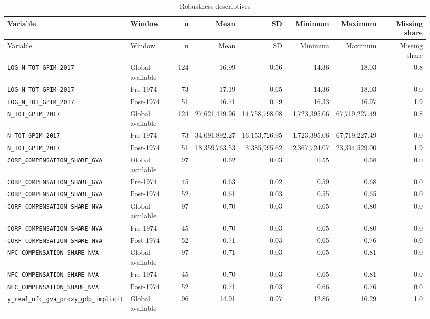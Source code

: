 \begin{landscape}
\begin{longtable}{p{4.4cm}p{3.8cm}rrrrrr}
\caption{Robustness descriptives}\\
\toprule
Variable & Window & n & Mean & SD & Minimum & Maximum & Missing share\\
\midrule
\endfirsthead
\toprule
Variable & Window & n & Mean & SD & Minimum & Maximum & Missing share\\
\midrule
\endhead
\nolinkurl{LOG_N_TOT_GPIM_2017} & Global available & 124 & 16.99 & 0.56 & 14.36 & 18.03 & 0.8
\\
\nolinkurl{LOG_N_TOT_GPIM_2017} & Pre-1974 & 73 & 17.19 & 0.65 & 14.36 & 18.03 & 0.0
\\
\nolinkurl{LOG_N_TOT_GPIM_2017} & Post-1974 & 51 & 16.71 & 0.19 & 16.33 & 16.97 & 1.9
\\
\nolinkurl{N_TOT_GPIM_2017} & Global available & 124 & 27,621,419.96 & 14,758,798.08 & 1,723,395.06 & 67,719,227.49 & 0.8
\\
\nolinkurl{N_TOT_GPIM_2017} & Pre-1974 & 73 & 34,091,892.27 & 16,153,726.95 & 1,723,395.06 & 67,719,227.49 & 0.0
\\
\nolinkurl{N_TOT_GPIM_2017} & Post-1974 & 51 & 18,359,763.53 & 3,385,995.62 & 12,367,724.07 & 23,394,529.00 & 1.9
\\
\nolinkurl{CORP_COMPENSATION_SHARE_GVA} & Global available & 97 & 0.62 & 0.03 & 0.55 & 0.68 & 0.0
\\
\nolinkurl{CORP_COMPENSATION_SHARE_GVA} & Pre-1974 & 45 & 0.63 & 0.02 & 0.59 & 0.68 & 0.0
\\
\nolinkurl{CORP_COMPENSATION_SHARE_GVA} & Post-1974 & 52 & 0.61 & 0.03 & 0.55 & 0.65 & 0.0
\\
\nolinkurl{CORP_COMPENSATION_SHARE_NVA} & Global available & 97 & 0.70 & 0.03 & 0.65 & 0.80 & 0.0
\\
\nolinkurl{CORP_COMPENSATION_SHARE_NVA} & Pre-1974 & 45 & 0.70 & 0.03 & 0.65 & 0.80 & 0.0
\\
\nolinkurl{CORP_COMPENSATION_SHARE_NVA} & Post-1974 & 52 & 0.71 & 0.03 & 0.65 & 0.76 & 0.0
\\
\nolinkurl{NFC_COMPENSATION_SHARE_NVA} & Global available & 97 & 0.71 & 0.03 & 0.65 & 0.81 & 0.0
\\
\nolinkurl{NFC_COMPENSATION_SHARE_NVA} & Pre-1974 & 45 & 0.70 & 0.03 & 0.65 & 0.81 & 0.0
\\
\nolinkurl{NFC_COMPENSATION_SHARE_NVA} & Post-1974 & 52 & 0.71 & 0.03 & 0.66 & 0.76 & 0.0
\\
\nolinkurl{y_real_nfc_gva_proxy_gdp_implicit} & Global available & 96 & 14.91 & 0.97 & 12.86 & 16.29 & 1.0

\end{longtable}
\end{landscape}
